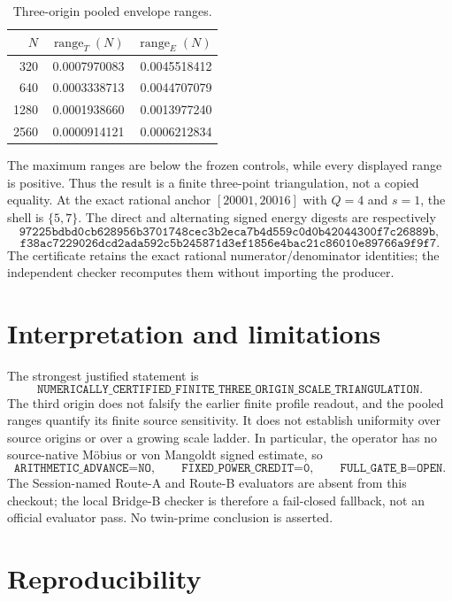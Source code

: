 \documentclass[10pt]{article}
\begin{document}
\begin{table}[ht]
\centering
\caption{Three-origin pooled envelope ranges.}
\label{tab:range}
\small
\begin{tabular}{rrr}
\toprule
$N$ & $\operatorname{range}_T(N)$ & $\operatorname{range}_E(N)$\\
\midrule
320  & 0.0007970083 & 0.0045518412\\
640  & 0.0003338713 & 0.0044707079\\
1280 & 0.0001938660 & 0.0013977240\\
2560 & 0.0000914121 & 0.0006212834\\
\bottomrule
\end{tabular}
\end{table}

The maximum ranges are below the frozen controls, while every displayed
range is positive.  Thus the result is a finite three-point triangulation,
not a copied equality.  At the exact rational anchor $[20001,20016]$ with
$Q=4$ and $s=1$, the shell is $\{5,7\}$.  The direct and alternating signed
energy digests are respectively
\[
\texttt{97225bdbd0cb628956b3701748cec3b2eca7b4d559c0d0b42044300f7c26889b},
\]
\[
\texttt{f38ac7229026dcd2ada592c5b245871d3ef1856e4bac21c86010e89766a9f9f7}.
\]
The certificate retains the exact rational numerator/denominator identities;
the independent checker recomputes them without importing the producer.

\section{Interpretation and limitations}

The strongest justified statement is
\[
\texttt{NUMERICALLY\_CERTIFIED\_FINITE\_THREE\_ORIGIN\_SCALE\_TRIANGULATION}.
\]
The third origin does not falsify the earlier finite profile readout, and the
pooled ranges quantify its finite source sensitivity.  It does not establish
uniformity over source origins or over a growing scale ladder.  In particular,
the operator has no source-native Möbius or von Mangoldt signed estimate, so
\[
\texttt{ARITHMETIC\_ADVANCE=NO},\qquad
\texttt{FIXED\_POWER\_CREDIT=0},\qquad
\texttt{FULL\_GATE\_B=OPEN}.
\]
The Session-named Route-A and Route-B evaluators are absent from this
checkout; the local Bridge-B checker is therefore a fail-closed fallback,
not an official evaluator pass.  No twin-prime conclusion is asserted.

\section{Reproducibility}
\end{document}
